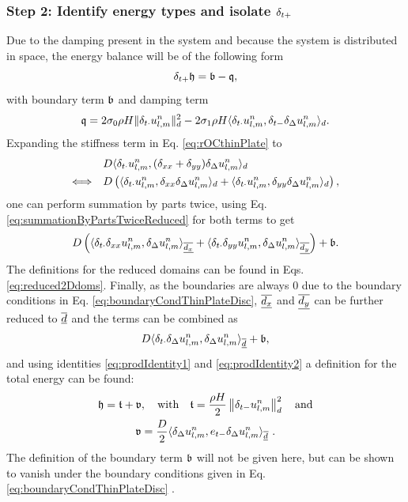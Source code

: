 {\subsubsection{Step 2: Identify energy types and isolate $\delta_{t+}$}
Due to the damping present in the system and because the system is distributed in space, the energy balance will be of the following form
\begin{equation*}
    \delta_{t+} \mathfrak{h} = \mathfrak{b}-\mathfrak{q}, 
\end{equation*}
with boundary term $\mathfrak{b}$ and damping term
\begin{equation}\label{eq:dampingTermThinPlate}
    \mathfrak{q} = 2\sigma_{0} \rho H \lVert\delta_{t\cdot}u_{l,m}^n\rVert_d^2 - 2 \sigma_{1} \rho H \langle \delta_{t\cdot} u_{l,m}^n, \delta_{t-} \delta_{\Delta}u_{l,m}^n \rangle_d.
\end{equation}
Expanding the stiffness term in Eq. \eqref{eq:rOCthinPlate} to
\begin{align*}
    &\ D\langle \delta_{t\cdot} u_{l,m}^n, (\delta_{xx} + \delta_{yy})\delta_{\Delta} u_{l,m}^n \rangle_d\\
    \Longleftrightarrow\ \ &\ D\left(\langle \delta_{t\cdot} u_{l,m}^n, \delta_{xx}\delta_{\Delta} u_{l,m}^n \rangle_d + \langle \delta_{t\cdot} u_{l,m}^n, \delta_{yy}\delta_{\Delta} u_{l,m}^n \rangle_d\right),
\end{align*} 
one can perform summation by parts twice, using Eq. \eqref{eq:summationByPartsTwiceReduced} for both terms to get
\begin{equation*}
    D\left(\langle \delta_{t\cdot} \delta_{xx}u_{l,m}^n, \delta_{\Delta} u_{l,m}^n \rangle_{\underline{\overline{d_x}}} + \langle \delta_{t\cdot}\delta_{yy} u_{l,m}^n, \delta_{\Delta} u_{l,m}^n \rangle_{\underline{\overline{d_y}}}\right) + \mathfrak{b}.
\end{equation*}
The definitions for the reduced domains can be found in Eqs. \eqref{eq:reduced2Ddoms}. Finally, as the boundaries are always $0$ due to the boundary conditions in Eq. \eqref{eq:boundaryCondThinPlateDisc}, $\underline{\overline{d_x}}$ and $\underline{\overline{d_y}}$ can be further reduced to $\underline{\overline{d}}$ and the terms can be combined as
\begin{equation*}
    D\langle \delta_{t\cdot}\delta_{\Delta}u_{l,m}^n, \delta_{\Delta} u_{l,m}^n \rangle_{\underline{\overline{d}}} + \mathfrak{b} ,
\end{equation*}
and using identities \eqref{eq:prodIdentity1} and \eqref{eq:prodIdentity2} a definition for the total energy can be found:
\begin{equation}\label{eq:energyBalanceThinPlate}
    \begin{gathered}
        \mathfrak{h} = \mathfrak{t} + \mathfrak{v}, \quad \text{with} \quad \mathfrak{t} = \frac{\rho H}{2} \left\lVert\delta_{t-}u_{l,m}^n\right\rVert_{d}^2 \quad \text{and} \\
        \mathfrak{v} = \frac{D}{2}\langle\delta_{\Delta} u_{l,m}^n, e_{t-}\delta_{\Delta} u_{l,m}^n\rangle_{\overline{\underline{d}}}\ .
    \end{gathered}
\end{equation}
The definition of the boundary term $\mathfrak{b}$ will not be given here, but can be shown to vanish under the boundary conditions given in Eq. \eqref{eq:boundaryCondThinPlateDisc} \cite{theBible}.

}
